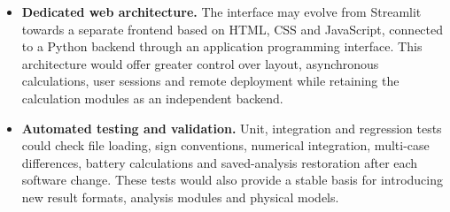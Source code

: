 \begin{itemize}[
    leftmargin=*,
    itemsep=0.9em,
    topsep=0.5em,
    parsep=0pt
]
    \item \textbf{Dedicated web architecture.}
    The interface may evolve from Streamlit towards a separate frontend based
    on HTML, CSS and JavaScript, connected to a Python backend through an
    application programming interface. This architecture would offer greater
    control over layout, asynchronous calculations, user sessions and remote
    deployment while retaining the calculation modules as an independent
    backend.

    \item \textbf{Automated testing and validation.}
    Unit, integration and regression tests could check file loading, sign
    conventions, numerical integration, multi-case differences, battery
    calculations and saved-analysis restoration after each software change.
    These tests would also provide a stable basis for introducing new result
    formats, analysis modules and physical models.
\end{itemize}
